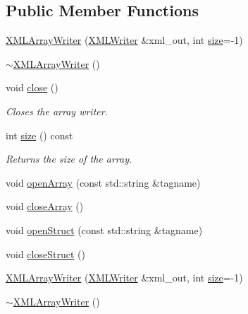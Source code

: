 \subsection*{Public Member Functions}
\begin{DoxyCompactItemize}
\item 
\mbox{\hyperlink{classADATXML_1_1XMLArrayWriter_a51816af0342b997945b0d21e4ba30c5d}{X\+M\+L\+Array\+Writer}} (\mbox{\hyperlink{classADATXML_1_1XMLWriter}{X\+M\+L\+Writer}} \&xml\+\_\+out, int \mbox{\hyperlink{classADATXML_1_1XMLArrayWriter_a152ffb3695b1f644614a7ca7ca86efa0}{size}}=-\/1)
\item 
\mbox{\hyperlink{classADATXML_1_1XMLArrayWriter_ac1e9df12a7df4c52d6026c3b814abf65}{$\sim$\+X\+M\+L\+Array\+Writer}} ()
\item 
void \mbox{\hyperlink{classADATXML_1_1XMLArrayWriter_a89774ac16fd8636da94745ccba7add0a}{close}} ()
\begin{DoxyCompactList}\small\item\em Closes the array writer. \end{DoxyCompactList}\item 
int \mbox{\hyperlink{classADATXML_1_1XMLArrayWriter_a152ffb3695b1f644614a7ca7ca86efa0}{size}} () const
\begin{DoxyCompactList}\small\item\em Returns the size of the array. \end{DoxyCompactList}\item 
void \mbox{\hyperlink{classADATXML_1_1XMLArrayWriter_aae20d7fa7fe499da36f54ae08b64860e}{open\+Array}} (const std\+::string \&tagname)
\item 
void \mbox{\hyperlink{classADATXML_1_1XMLArrayWriter_a5d6b79a0e8add658220f21e5fc138230}{close\+Array}} ()
\item 
void \mbox{\hyperlink{classADATXML_1_1XMLArrayWriter_af1602cb14d54aa8e42442f2784c00e22}{open\+Struct}} (const std\+::string \&tagname)
\item 
void \mbox{\hyperlink{classADATXML_1_1XMLArrayWriter_a5a849f8851bce99654c44dc08b1fe486}{close\+Struct}} ()
\item 
\mbox{\hyperlink{classADATXML_1_1XMLArrayWriter_a51816af0342b997945b0d21e4ba30c5d}{X\+M\+L\+Array\+Writer}} (\mbox{\hyperlink{classADATXML_1_1XMLWriter}{X\+M\+L\+Writer}} \&xml\+\_\+out, int \mbox{\hyperlink{classADATXML_1_1XMLArrayWriter_a152ffb3695b1f644614a7ca7ca86efa0}{size}}=-\/1)
\item 
\mbox{\hyperlink{classADATXML_1_1XMLArrayWriter_ac1e9df12a7df4c52d6026c3b814abf65}{$\sim$\+X\+M\+L\+Array\+Writer}} ()

\end{DoxyCompactItemize}
